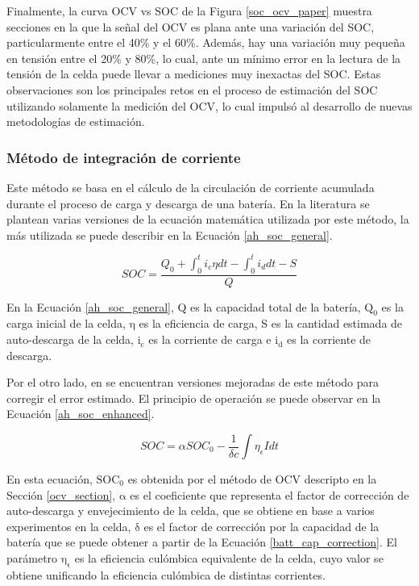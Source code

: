 \noindent Finalmente, la curva \acrshort{OCV} vs \acrshort{SOC} de la Figura
\ref{soc_ocv_paper} muestra secciones en la que la señal del \acrshort{OCV} es
plana ante una variaci\'on del \acrshort{SOC}, particularmente entre el 40\% y
el 60\%. Adem\'as, hay una variaci\'on muy pequeña en tensi\'on entre el 20\% y
80\%, lo cual, ante un m\'inimo error en la lectura de la tensi\'on de la celda
puede llevar a mediciones muy inexactas del \acrshort{SOC}. Estas observaciones
son los principales retos en el proceso de estimaci\'on del \acrshort{SOC} 
utilizando solamente la medici\'on del \acrshort{OCV}, lo cual impuls\'o al 
desarrollo de nuevas metodolog\'ias de estimaci\'on.

\newpage

\subsubsection{M\'etodo de integraci\'on de corriente}\label{ahMethod}

\noindent Este m\'etodo se basa en el c\'alculo de la circulaci\'on de 
corriente acumulada durante el proceso de carga y descarga de una bater\'ia. En 
la literatura se plantean varias versiones de la ecuaci\'on matem\'atica
utilizada por este m\'etodo, la m\'as utilizada se puede describir en la 
Ecuaci\'on \ref{ah_soc_general}.

\begin{equation}
    SOC = \frac{Q_0 + \int_{0}^t i_c\eta dt - \int_{0}^t i_d dt - S}{Q}
    \label{ah_soc_general}
\end{equation}

\noindent En la Ecuaci\'on \ref{ah_soc_general}, Q es la capacidad total de la 
bater\'ia, $\mathrm{Q_0}$ es la carga inicial de la celda, $\mathrm{\eta}$ es la 
eficiencia de carga, S es la cantidad estimada de auto-descarga de la celda, 
$\mathrm{i_c}$ es la corriente de carga e $\mathrm{i_d}$ es la corriente de 
descarga.

\noindent Por el otro lado, en \cite{ZHANG201524} se encuentran 
versiones mejoradas de este m\'etodo para corregir el error estimado. 
El principio de operaci\'on se puede observar en la Ecuaci\'on 
\ref{ah_soc_enhanced}.

\begin{equation}
    SOC = \alpha SOC_0 - \frac{1}{\delta c}\int \eta_\epsilon I dt
    \label{ah_soc_enhanced}
\end{equation}

En esta ecuaci\'on, $\mathrm{SOC_0}$ es obtenida por el m\'etodo de
\acrshort{OCV} descripto en la Secci\'on \ref{ocv_section}, $\mathrm{\alpha}$ es
el coeficiente que representa el factor de correcci\'on de auto-descarga y
envejecimiento de la celda, que se obtiene en base a varios experimentos en la
celda, $\mathrm{\delta}$ es el factor de correcci\'on por la capacidad de la
bater\'ia que se puede obtener a partir de la Ecuaci\'on
\ref{batt_cap_correction}. El par\'ametro $\mathrm{\eta_\epsilon}$ es la
eficiencia cul\'ombica equivalente de la celda, cuyo valor se obtiene unificando
la eficiencia cul\'ombica de distintas corrientes.

